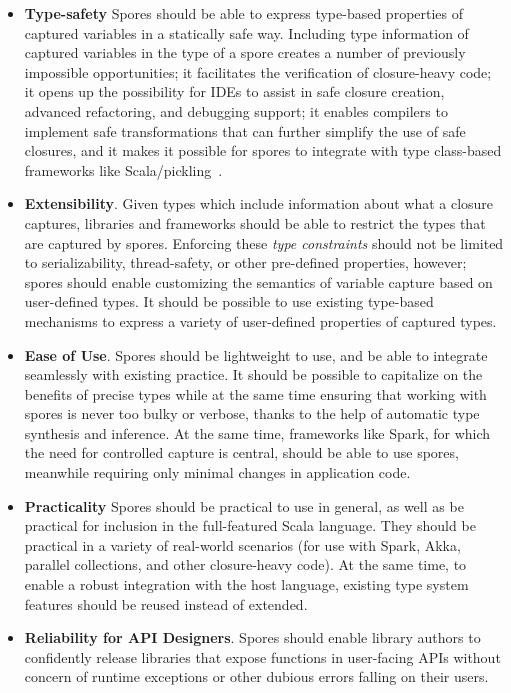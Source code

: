 \documentclass{llncs}
\begin{document}
\begin{itemize}
\item {\bf Type-safety} Spores should be able to express type-based
properties of captured variables in a statically safe way. Including type
information of captured variables in the type of a spore creates a number of
previously impossible opportunities; it facilitates the verification of
closure-heavy code; it opens up the possibility for IDEs to assist in safe
closure creation, advanced refactoring, and debugging support; it enables
compilers to implement safe transformations that can further simplify the use
of safe closures, and it makes it possible for spores to integrate with type
class-based frameworks like Scala/pickling~\cite{ScalaPickling}.

\item {\bf Extensibility}. Given types which include information about what  a
closure captures, libraries and frameworks should be able to restrict the
types that are captured by spores. Enforcing these {\em type constraints}
should not be limited to serializability, thread-safety, or other pre-defined
properties, however; spores should enable customizing the semantics of
variable capture based on user-defined types. It should be possible to use
existing type-based mechanisms to express a variety of user-defined properties
of captured types.

\item {\bf Ease of Use}. Spores should be lightweight
to use, and be able to integrate seamlessly with existing practice. It should
be possible to capitalize on the benefits of precise types while at the same
time ensuring that working with spores is never too bulky or verbose, thanks
to the help of automatic type synthesis and inference. At the same time,
frameworks like Spark, for which the need for controlled capture is central,
should be able to use spores, meanwhile requiring only minimal changes in
application code.

\item {\bf Practicality} Spores should be practical to use in general, as
well as be practical for inclusion in the full-featured Scala language. They
should be practical in a variety of real-world scenarios (for use with Spark,
Akka, parallel collections, and other closure-heavy code). At the same time,
to enable a robust integration with the host language, existing type system
features should be reused instead of extended.

\item {\bf Reliability for API Designers}. Spores should enable library
authors to confidently release libraries that expose functions in user-facing
APIs without concern of runtime exceptions or other dubious errors falling on
their users.

\end{itemize}
\end{document}

